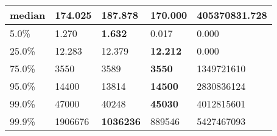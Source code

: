 \begin{table}[H]
\begin{tabular}{|l|m{10em}|m{10em}|m{10em}|m{10em}|}
\hline median & 174.025 & 187.878 & \bfseries 170.000 & \cellcolor[rgb]{0.9, 0.54, 0.52} 405370831.728 \\
\hline 5.0\% & 1.270 & \bfseries 1.632 & 0.017 & \cellcolor[rgb]{0.9, 0.54, 0.52} 0.000 \\
\hline 25.0\% & 12.283 & 12.379 & \bfseries 12.212 & \cellcolor[rgb]{0.9, 0.54, 0.52} 0.000 \\
\hline 75.0\% & 3550 & 3589 & \bfseries 3550 & \cellcolor[rgb]{0.9, 0.54, 0.52} 1349721610 \\
\hline 95.0\% & 14400 & 13814 & \bfseries 14500 & \cellcolor[rgb]{0.9, 0.54, 0.52} 2830836124 \\
\hline 99.0\% & 47000 & 40248 & \bfseries 45030 & \cellcolor[rgb]{0.9, 0.54, 0.52} 4012815601 \\
\hline 99.9\% & 1906676 & \bfseries 1036236 & 889546 & \cellcolor[rgb]{0.9, 0.54, 0.52} 5427467093 \\
\hline
\end{tabular}
\end{table}
